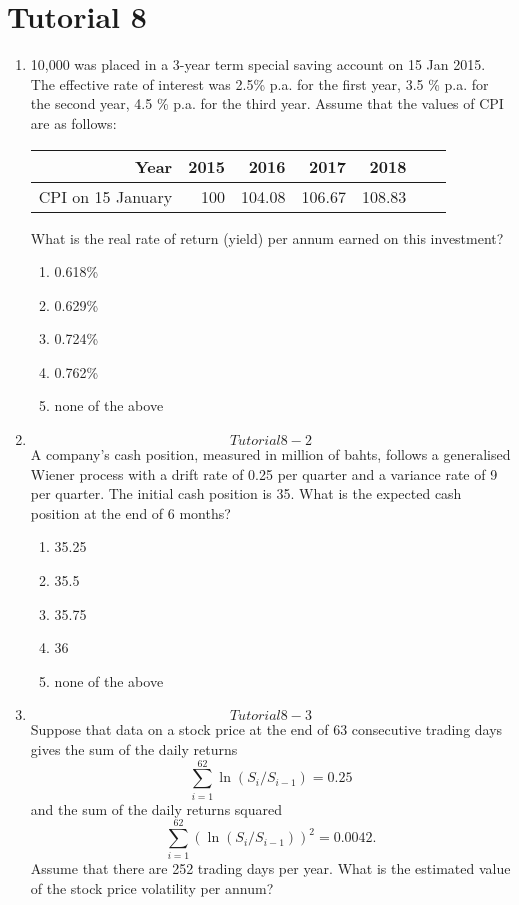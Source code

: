 \documentclass[
]{article}
\theoremstyle{definition}
\theoremstyle{definition}
\theoremstyle{definition}
\theoremstyle{definition}
\theoremstyle{remark}
\begin{document}
\hypertarget{tutorial-8}{%
\section{Tutorial 8}\label{tutorial-8}}

\begin{enumerate}
\def\labelenumi{\arabic{enumi}.}
\item
  10,000 was placed in a 3-year term special saving account on 15
  Jan 2015. The effective rate of interest was 2.5\% p.a. for the first
  year, 3.5 \% p.a. for the second year, 4.5 \% p.a. for the third year.
  Assume that the values of CPI are as follows:

  \begin{longtable}[]{@{}rrrrrll@{}}
  \toprule
  Year & 2015 & 2016 & 2017 & 2018 & & \\
  \midrule
  \endhead
  CPI on 15 January & 100 & 104.08 & 106.67 & 108.83 & & \\
  \bottomrule
  \end{longtable}

  What is the real rate of return (yield) per annum earned on this
  investment?

  \begin{enumerate}
  \def\labelenumii{\Alph{enumii}.}
  \item
    0.618\%
  \item
    0.629\%
  \item
    0.724\%
  \item
    0.762\%
  \item
    none of the above
  \end{enumerate}
\item
  \protect\hypertarget{Tutorial8-2}{}{\[Tutorial8-2\]} A company's cash position, measured in
  million of bahts, follows a generalised Wiener process with a drift
  rate of 0.25 per quarter and a variance rate of 9 per quarter. The
  initial cash position is 35. What is the expected cash position at
  the end of 6 months?

  \begin{enumerate}
  \def\labelenumii{\Alph{enumii}.}
  \item
    35.25
  \item
    35.5
  \item
    35.75
  \item
    36
  \item
    none of the above
  \end{enumerate}
\item
  \protect\hypertarget{Tutorial8-3}{}{\[Tutorial8-3\]} Suppose that data on a stock price at
  the end of 63 consecutive trading days gives the sum of the daily
  returns \[\sum_{i=1}^{62} \ln(S_i/S_{i-1}) = 0.25\] and the sum of
  the daily returns squared
  \[\sum_{i=1}^{62} \left( \ln(S_i/S_{i-1}) \right)^2= 0.0042.\]
  Assume that there are 252 trading days per year. What is the
  estimated value of the stock price volatility per annum?


\end{enumerate}
\end{document}
